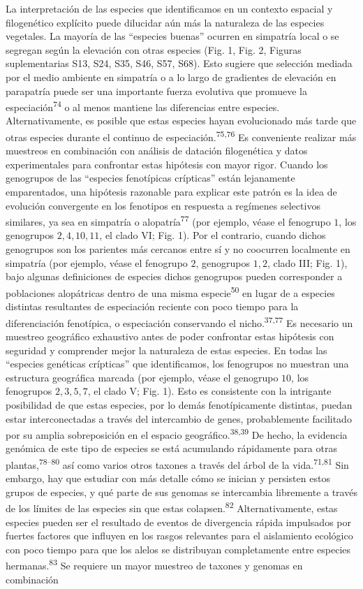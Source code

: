 \documentclass[
  11pt,
]{article}
\begin{document}
La interpretación de las especies que identificamos en un contexto espacial y filogenético explícito puede dilucidar aún más la naturaleza de las especies vegetales. La mayoría de las ``especies buenas'' ocurren en simpatría local o se segregan según la elevación con otras especies (Fig. 1, Fig. 2, Figuras suplementarias S13, S24, S35, S46, S57, S68). Esto sugiere que selección mediada por el medio ambiente en simpatría o a lo largo de gradientes de elevación en parapatría puede ser una importante fuerza evolutiva que promueve la especiación\textsuperscript{74} o al menos mantiene las diferencias entre especies. Alternativamente, es posible que estas especies hayan evolucionado más tarde que otras especies durante el continuo de especiación.\textsuperscript{75,76} Es conveniente realizar más muestreos en combinación con análisis de datación filogenética y datos experimentales para confrontar estas hipótesis con mayor rigor. Cuando los genogrupos de las ``especies fenotípicas crípticas'' están lejanamente emparentados, una hipótesis razonable para explicar este patrón es la idea de evolución convergente en los fenotipos en respuesta a regímenes selectivos similares, ya sea en simpatría o alopatría\textsuperscript{77} (por ejemplo, véase el fenogrupo \(1\), los genogrupos \(2, 4, 10, 11\), el clado VI; Fig. 1). Por el contrario, cuando dichos genogrupos son los parientes más cercanos entre sí y no coocurren localmente en simpatría (por ejemplo, véase el fenogrupo \(2\), genogrupos \(1, 2\), clado III; Fig. 1), bajo algunas definiciones de especies dichos genogrupos pueden corresponder a poblaciones alopátricas dentro de una misma especie\textsuperscript{50} en lugar de a especies distintas resultantes de especiación reciente con poco tiempo para la diferenciación fenotípica, o especiación conservando el nicho.\textsuperscript{37,77} Es necesario un muestreo geográfico exhaustivo antes de poder confrontar estas hipótesis con seguridad y comprender mejor la naturaleza de estas especies. En todas las ``especies genéticas crípticas'' que identificamos, los fenogrupos no muestran una estructura geográfica marcada (por ejemplo, véase el genogrupo \(10\), los fenogrupos \(2, 3, 5, 7\), el clado V; Fig. 1). Esto es consistente con la intrigante posibilidad de que estas especies, por lo demás fenotípicamente distintas, puedan estar interconectadas a través del intercambio de genes, probablemente facilitado por su amplia sobreposición en el espacio geográfico.\textsuperscript{38,39} De hecho, la evidencia genómica de este tipo de especies se está acumulando rápidamente para otras plantas,\textsuperscript{78--80} así como varios otros taxones a través del árbol de la vida.\textsuperscript{71,81} Sin embargo, hay que estudiar con más detalle cómo se inician y persisten estos grupos de especies, y qué parte de sus genomas se intercambia libremente a través de los límites de las especies sin que estas colapsen.\textsuperscript{82} Alternativamente, estas especies pueden ser el resultado de eventos de divergencia rápida impulsados por fuertes factores que influyen en los rasgos relevantes para el aislamiento ecológico con poco tiempo para que los alelos se distribuyan completamente entre especies hermanas.\textsuperscript{83} Se requiere un mayor muestreo de taxones y genomas en combinación 
\end{document}
